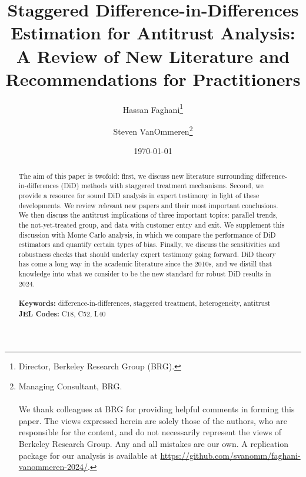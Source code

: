 \documentclass[12pt]{article}
\begin{document}
\begin{titlepage}
\title{Staggered Difference-in-Differences Estimation for Antitrust Analysis: A Review of New Literature and Recommendations for Practitioners}
\author{Hassan Faghani\thanks{Director, Berkeley Research Group (BRG).} \and Steven VanOmmeren\thanks{
Managing Consultant, BRG. \\\\ We thank colleagues at BRG for providing helpful comments in forming this paper. The views expressed herein are solely those of the authors, who are responsible for the content, and do not necessarily represent the views of Berkeley Research Group. Any and all mistakes are our own. A replication package for our analysis is available at \url{https://github.com/svanomm/faghani-vanommeren-2024/}.
}
}

\date{\today}
\maketitle
\begin{abstract}
\noindent 
The aim of this paper is twofold: first, we discuss new literature surrounding difference-in-differences (DiD) methods with staggered treatment mechanisms. Second, we provide a resource for sound DiD analysis in expert testimony in light of these developments. We review relevant new papers and their most important conclusions. We then discuss the antitrust implications of three important topics: parallel trends, the not-yet-treated group, and data with customer entry and exit. We supplement this discussion with Monte Carlo analysis, in which we compare the performance of DiD estimators and quantify certain types of bias. Finally, we discuss the sensitivities and robustness checks that should underlay expert testimony going forward. DiD theory has come a long way in the academic literature since the 2010s, and we distill that knowledge into what we consider to be the new standard for robust DiD results in 2024.\\
\vspace{0in}\\
\noindent\textbf{Keywords:} difference-in-differences, staggered treatment, heterogeneity, antitrust
\vspace{0in}\\
\noindent\textbf{JEL Codes:} C18, C52, L40\\

\bigskip
\end{abstract}
\setcounter{page}{0}
\thispagestyle{empty}
\end{titlepage}
\pagebreak \newpage
\end{document}
